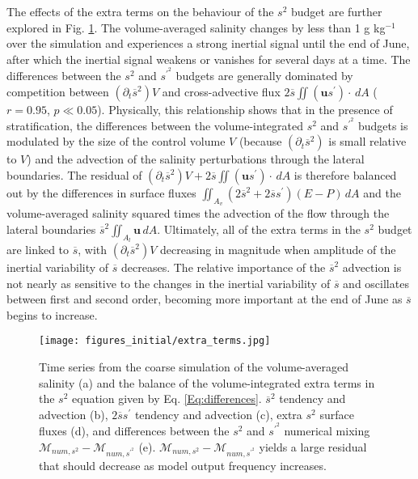 \documentclass[draft]{agujournal2019}
\begin{document}
The effects of the extra terms on the behaviour of the $s^2$ budget are further explored in Fig. \ref{fig:s2_extra_terms}. The volume-averaged salinity changes by less than 1 g kg$^{-1}$ over the simulation and experiences a strong inertial signal until the end of June, after which the inertial signal weakens or vanishes for several days at a time. The differences between the $s^2$ and $s^{\prime^2}$ budgets are generally dominated by competition between $(\partial_t \overline{s}^2)V$ and cross-advective flux $2 \overline{s} \iint (\mathbf{u}s^\prime) \cdot \, dA$ ($r = 0.95$, $p \ll 0.05$). Physically, this relationship shows that in the presence of stratification, the differences between the volume-integrated $s^2$ and $s^{\prime^2}$ budgets is modulated by the size of the control volume $V$ (because $(\partial_t \overline{s}^2)$ is small relative to $V$) and the advection of the salinity perturbations through the lateral boundaries. The residual of $(\partial_t \overline{s}^2)V+2 \overline{s} \iint (\mathbf{u}s^\prime) \cdot \, dA$ is therefore balanced out by the differences in surface fluxes $\iint_{A_v} (2 \overline{s}^2 + 2 \overline{s} s^\prime)(E-P) \, dA$ and the volume-averaged salinity squared times the advection of the flow through the lateral boundaries $\overline{s}^2 \iint_{A_l} \mathbf{u} \, dA$. Ultimately, all of the extra terms in the $s^2$ budget are linked to $\overline{s}$, with $(\partial_t \overline{s}^2)V$ decreasing in magnitude when amplitude of the inertial variability of $\overline{s}$ decreases. The relative importance of the $\overline{s}^2$ advection is not nearly as sensitive to the changes in the inertial variability of $\overline{s}$ and oscillates between first and second order, becoming more important at the end of June as $\overline{s}$ begins to increase.

\begin{figure}[ht!]
 \centerline{\texttt{[image: figures\_initial/extra\_terms.jpg]}}
  \caption{Time series from the coarse simulation of the volume-averaged salinity (a) and the balance of the volume-integrated extra terms in the $s^2$ equation given by Eq. \ref{Eq:differences}. $\overline{s}^2$ tendency and advection (b), $2 \overline{s} s^\prime$ tendency and advection (c), extra $s^2$ surface fluxes (d), and differences between the $s^2$ and $s^{\prime^2}$ numerical mixing $\mathcal{M}_{num, s^2}-\mathcal{M}_{num, s^{\prime^2}}$ (e). $\mathcal{M}_{num, s^2}-\mathcal{M}_{num, s^{\prime^2}}$ yields a large residual that should decrease as model output frequency increases.}
  \label{fig:s2_extra_terms}
\end{figure}
\end{document}
